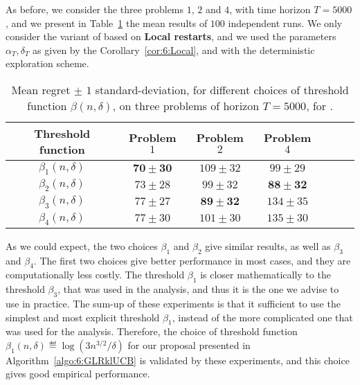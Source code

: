 As before, we consider the three problems $1$, $2$ and $4$, with time horizon $T=5000$,
and we present in Table~\ref{table:6:exploringDifferentThresholdFunctions} the mean results of $100$ independent runs.
We only consider the variant of \GLRklUCB{} based on \textbf{Local restarts}, and we used the parameters $\alpha_T,\delta_T$ as given by the Corollary~\ref{cor:6:Local},
and with the deterministic exploration scheme.

\begin{table}[ht]
    \centering
    \begin{tabular}{c|cccccc}
        \textbf{Threshold function} & Problem $1$ & Problem $2$ & Problem $4$ \\
        \hline
        $\beta_1(n,\delta)$ & $\mathbf{70 \pm 30}$ & $109 \pm 32$ & $99 \pm 29$ \\
        $\beta_2(n,\delta)$ & $73 \pm 28$ & $99 \pm 32$ & $\mathbf{88 \pm 32}$ \\
        $\beta_3(n,\delta)$ & $77 \pm 27$ & $\mathbf{89 \pm 32}$ & $134 \pm 35$ \\
        $\beta_4(n,\delta)$ & $77 \pm 30$ & $101 \pm 30$ & $135 \pm 30$
    \end{tabular}
    \caption{Mean regret $\pm$ $1$ standard-deviation, for different choices of threshold function $\beta(n,\delta)$, on three problems of horizon $T=5000$, for \GLRklUCB.}
    \label{table:6:exploringDifferentThresholdFunctions}
\end{table}

As we could expect, the two choices $\beta_1$ and $\beta_2$ give similar results, as well as $\beta_3$ and $\beta_4$. The first two choices give better performance in most cases, and they are computationally less costly.
The threshold $\beta_1$ is closer mathematically to the threshold $\beta_3$, that was used in the analysis, and thus it is the one we advise to use in practice.
The sum-up of these experiments is that it sufficient to use the simplest and most explicit threshold $\beta_1$, instead of the more complicated one that was used for the analysis.
Therefore, the choice of threshold function $\beta_1(n, \delta) \eqdef \log\left(3 n^{3/2} / \delta\right)$ for our proposal \GLRklUCB{} presented in Algorithm~\ref{algo:6:GLRklUCB} is validated by these experiments, and this choice gives good empirical performance.


